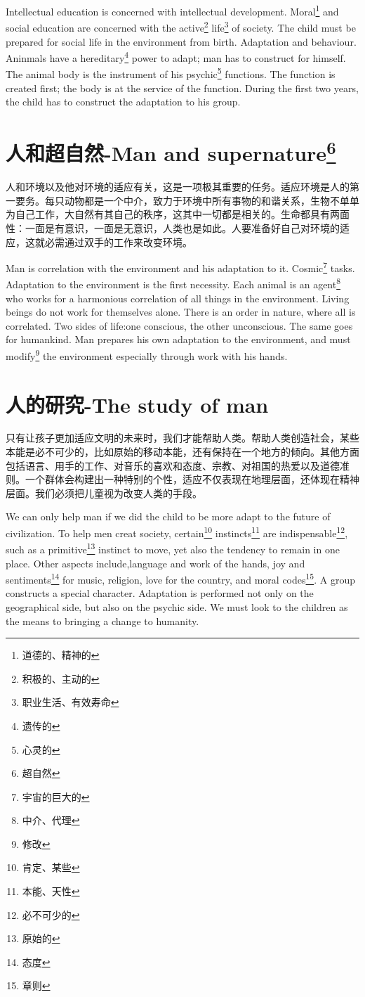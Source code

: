 \documentclass[lang=cn,10pt]{elegantbook}
\begin{document}
Intellectual education is concerned with intellectual development. Moral\footnote{道德的、精神的} and social education are concerned with the active\footnote{积极的、主动的} life\footnote{职业生活、有效寿命} of society. The child must be prepared for social life in the environment from birth. Adaptation and behaviour. Aninmals have a hereditary\footnote{遗传的} power to adapt; man has to construct for himself. The animal body is the instrument of his psychic\footnote{心灵的} functions. The function is created first; the body is at the service of the function. During the first two years, the child has to construct the adaptation to his group.

\chapter{人和超自然-Man and supernature\footnote{超自然}}

人和环境以及他对环境的适应有关，这是一项极其重要的任务。适应环境是人的第一要务。每只动物都是一个中介，致力于环境中所有事物的和谐关系，生物不单单为自己工作，大自然有其自己的秩序，这其中一切都是相关的。生命都具有两面性：一面是有意识，一面是无意识，人类也是如此。人要准备好自己对环境的适应，这就必需通过双手的工作来改变环境。

Man is correlation with the environment and his adaptation to it. Cosmic\footnote{宇宙的巨大的} tasks. Adaptation to the environment is the first necessity. Each animal is an agent\footnote{中介、代理} who works for a harmonious correlation of all things in the environment. Living beings do not work for themselves alone. There is an order in nature, where all is correlated. Two sides of life:one conscious, the other unconscious. The same goes for humankind. Man prepares his own adaptation to the environment, and must modify\footnote{修改} the environment especially through work with his hands.

\chapter{人的研究-The study of man}

只有让孩子更加适应文明的未来时，我们才能帮助人类。帮助人类创造社会，某些本能是必不可少的，比如原始的移动本能，还有保持在一个地方的倾向。其他方面包括语言、用手的工作、对音乐的喜欢和态度、宗教、对祖国的热爱以及道德准则。一个群体会构建出一种特别的个性，适应不仅表现在地理层面，还体现在精神层面。我们必须把儿童视为改变人类的手段。

We can only help man if we did the child to be more adapt to the future of civilization. To help men creat society, certain\footnote{肯定、某些} instincts\footnote{本能、天性} are indispensable\footnote{必不可少的}, such as a primitive\footnote{原始的} instinct to move, yet also the tendency to remain in one place. Other aspects include,language and work of the hands, joy and sentiments\footnote{态度} for music, religion, love for the country, and moral codes\footnote{章则}. A group constructs a special character. Adaptation is performed not only on the geographical side, but also on the psychic side. We must look to the children as the means to bringing a change to humanity.
\end{document}
